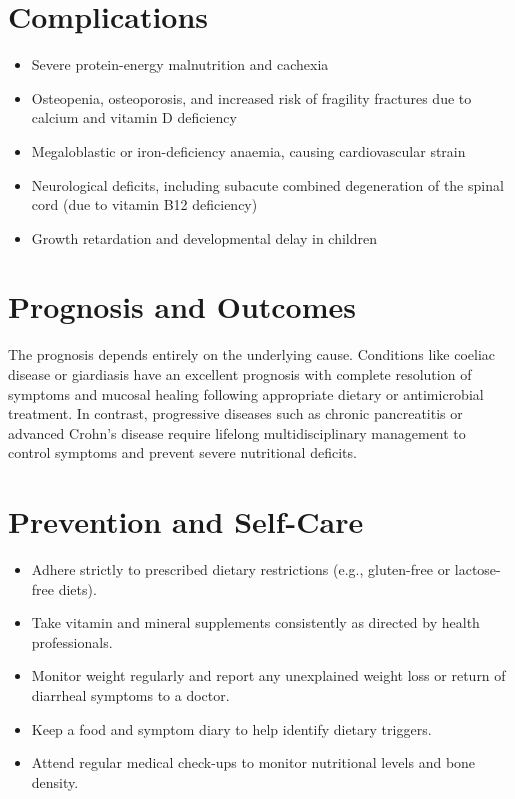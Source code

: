 \section*{Complications}
\begin{itemize}
    \item Severe protein-energy malnutrition and cachexia
    \item Osteopenia, osteoporosis, and increased risk of fragility fractures due to calcium and vitamin D deficiency
    \item Megaloblastic or iron-deficiency anaemia, causing cardiovascular strain
    \item Neurological deficits, including subacute combined degeneration of the spinal cord (due to vitamin B12 deficiency)
    \item Growth retardation and developmental delay in children
\end{itemize}

\section*{Prognosis and Outcomes}
The prognosis depends entirely on the underlying cause. Conditions like coeliac disease or giardiasis have an excellent prognosis with complete resolution of symptoms and mucosal healing following appropriate dietary or antimicrobial treatment. In contrast, progressive diseases such as chronic pancreatitis or advanced Crohn's disease require lifelong multidisciplinary management to control symptoms and prevent severe nutritional deficits.

\section*{Prevention and Self-Care}
\begin{itemize}
    \item Adhere strictly to prescribed dietary restrictions (e.g., gluten-free or lactose-free diets).
    \item Take vitamin and mineral supplements consistently as directed by health professionals.
    \item Monitor weight regularly and report any unexplained weight loss or return of diarrheal symptoms to a doctor.
    \item Keep a food and symptom diary to help identify dietary triggers.
    \item Attend regular medical check-ups to monitor nutritional levels and bone density.
\end{itemize}

